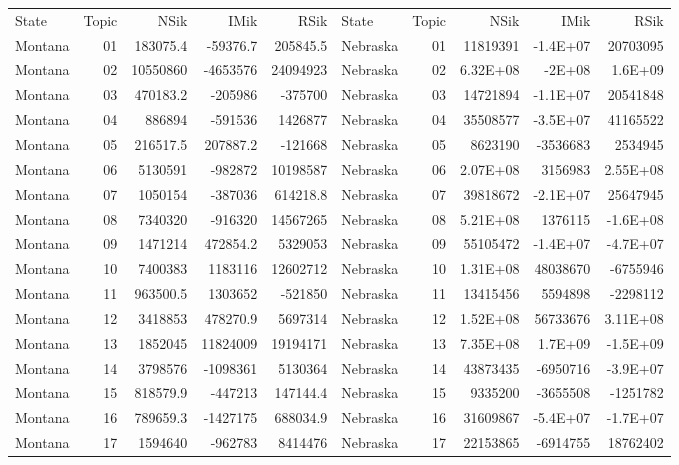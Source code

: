 \begin{table}[]
	\footnotesize
	\begin{tabular}{lrrrrlrrrr}
		State & Topic & NSik & IMik & RSik & State & Topic & NSik & IMik & RSik \\
		Montana &  01  & 183075.4 & -59376.7 & 205845.5 & Nebraska &  01  & 11819391 & -1.4E+07 & 20703095 \\
		Montana &  02  & 10550860 & -4653576 & 24094923 & Nebraska &  02  & 6.32E+08 & -2E+08 & 1.6E+09 \\
		Montana &  03  & 470183.2 & -205986 & -375700 & Nebraska &  03  & 14721894 & -1.1E+07 & 20541848 \\
		Montana &  04  & 886894 & -591536 & 1426877 & Nebraska &  04  & 35508577 & -3.5E+07 & 41165522 \\
		Montana &  05  & 216517.5 & 207887.2 & -121668 & Nebraska &  05  & 8623190 & -3536683 & 2534945 \\
		Montana &  06  & 5130591 & -982872 & 10198587 & Nebraska &  06  & 2.07E+08 & 3156983 & 2.55E+08 \\
		Montana &  07  & 1050154 & -387036 & 614218.8 & Nebraska &  07  & 39818672 & -2.1E+07 & 25647945 \\
		Montana &  08  & 7340320 & -916320 & 14567265 & Nebraska &  08  & 5.21E+08 & 1376115 & -1.6E+08 \\
		Montana &  09  & 1471214 & 472854.2 & 5329053 & Nebraska &  09  & 55105472 & -1.4E+07 & -4.7E+07 \\
		Montana &  10 & 7400383 & 1183116 & 12602712 & Nebraska &  10 & 1.31E+08 & 48038670 & -6755946 \\
		Montana &  11 & 963500.5 & 1303652 & -521850 & Nebraska &  11 & 13415456 & 5594898 & -2298112 \\
		Montana &  12 & 3418853 & 478270.9 & 5697314 & Nebraska &  12 & 1.52E+08 & 56733676 & 3.11E+08 \\
		Montana &  13 & 1852045 & 11824009 & 19194171 & Nebraska &  13 & 7.35E+08 & 1.7E+09 & -1.5E+09 \\
		Montana &  14 & 3798576 & -1098361 & 5130364 & Nebraska &  14 & 43873435 & -6950716 & -3.9E+07 \\
		Montana &  15 & 818579.9 & -447213 & 147144.4 & Nebraska &  15 & 9335200 & -3655508 & -1251782 \\
		Montana &  16 & 789659.3 & -1427175 & 688034.9 & Nebraska &  16 & 31609867 & -5.4E+07 & -1.7E+07 \\
		Montana &  17 & 1594640 & -962783 & 8414476 & Nebraska &  17 & 22153865 & -6914755 & 18762402 \\

\end{tabular}
\end{table}
